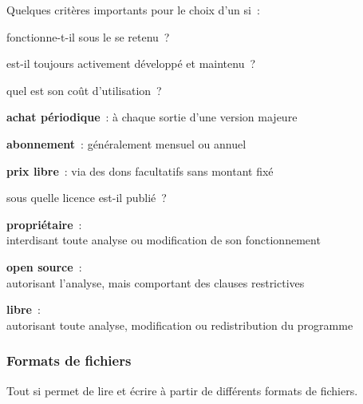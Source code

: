 Quelques critères importants pour le choix d’un \gls{si} :
\begin{itmz}
\item{fonctionne-t-il sous le \gls{se} retenu ?}
\item{est-il toujours activement développé et maintenu ?}
\item{quel est son coût d’utilisation ?
    \begin{itmz}
    \item{\textbf{achat périodique} : à chaque sortie d’une version majeure}
    \item{\textbf{abonnement} : généralement mensuel ou annuel}
    \item{\textbf{prix libre} : via des dons facultatifs sans montant fixé}
    \end{itmz}
}
\item{sous quelle licence est-il publié ?
    \begin{itmz}
    \item{\textbf{propriétaire} :\\
    interdisant toute analyse ou modification de son fonctionnement}
    \item{\textbf{open source} :\\
    autorisant l’analyse, mais comportant des clauses restrictives}
    \item{\textbf{libre} :\\
    autorisant toute analyse, modification ou redistribution du programme}
    \end{itmz}
}
\end{itmz}

\pagebreak

\subsubsection{Formats de fichiers}

Tout \gls{si} permet de lire et écrire à partir de différents formats de fichiers.

